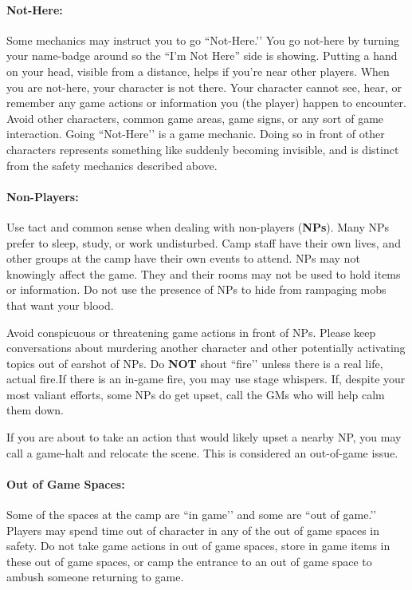 \documentclass[sheet]{GL2020}
\begin{document}
\paragraph{Not-Here:} Some mechanics may instruct you to go ``Not-Here.’’ You go not-here by turning your name-badge around so the ``I'm Not Here'' side is showing. Putting a hand on your head, visible from a distance, helps if you're near other players. When you are not-here, your character is not there.  Your character cannot see, hear, or remember any game actions or information you (the player) happen to encounter.  Avoid other characters, common game
areas, game signs, or any sort of game interaction. Going ``Not-Here’’ is a game mechanic. Doing so in front of other characters represents something like suddenly becoming invisible, and is distinct from the safety mechanics described above.

\paragraph{Non-Players:} Use tact and common sense when dealing with non-players ({\bf NPs}).  Many NPs prefer to sleep, study, or work undisturbed. Camp staff have their own lives, and other groups at the camp have their own events to attend. NPs may not knowingly affect the game. They and their rooms may not be used to hold items or information. Do not use the presence of NPs to hide from rampaging mobs that want your blood.

Avoid conspicuous or threatening game actions in front of NPs. Please keep conversations about murdering another character and other potentially activating topics out of earshot of NPs. Do \textbf{NOT} shout ``fire’’ unless there is a real life, actual fire.If there is an in-game fire, you may use stage whispers. If, despite your most valiant efforts, some NPs do get upset, call the GMs who will help calm them down.

If you are about to take an action that would likely upset a nearby NP, you may call a game-halt and relocate the scene. This is considered an out-of-game issue.

\paragraph{Out of Game Spaces:} Some of the spaces at the camp are ``in game’’ and some are ``out of game.’’ Players may spend time out of character in any of the out of game spaces in safety. Do not take game actions in out of game spaces, store in game items in these out of game spaces, or camp the entrance to an out of game space to ambush someone returning to game.
\end{document}
